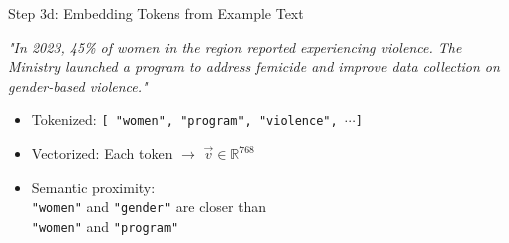 \documentclass[xcolor=x11names,  aspectratio=169, compress]{beamer}
\renewcommand{\(}{\begin{columns}}
\renewcommand{\)}{\end{columns}}
\newcommand{\<}[1]{\begin{column}{#1}}
\renewcommand{\>}{\end{column}}
\begin{document}
\begin{frame}{Step 3d: Embedding Tokens from Example Text}

\emph{"In 2023, 45\% of women in the region reported experiencing violence. 
The Ministry launched a program to address femicide and improve data collection on gender-based violence."} \\
\vspace{0.5cm}

\begin{itemize}
    \item Tokenized: \texttt{[ "women", "program", "violence", $\cdots$]}
    \item Vectorized: Each token $\rightarrow$ $\vec{v} \in \mathbb{R}^{768}$ 
    \item Semantic proximity: \\
    \texttt{"women"} and \texttt{"gender"} are closer than\\ \texttt{"women"} and \texttt{"program"}
\end{itemize}

\begin{center}
\end{center}

\end{frame}
\end{document}
